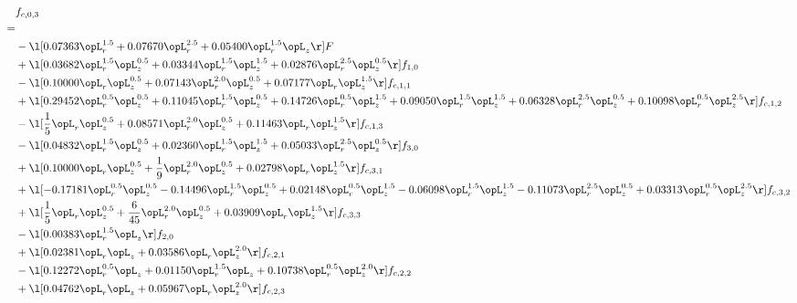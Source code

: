 \begin{alignat}{2} 
\label{eq:f_03_2} 
& f_{c,0,3} \nonumber \\ 
 = \\ 
& - \l[  0.07363 \opL_r^{1.5} +  0.07670 \opL_r^{2.5} +  0.05400 \opL_r^{1.5} \opL_z  \r] F \nonumber \\ 
& + \l[  0.03682 \opL_r^{1.5} \opL_z^{0.5} +  0.03344 \opL_r^{1.5} \opL_z^{1.5} +  0.02876 \opL_r^{2.5} \opL_z^{0.5}  \r] f_{1,0} \nonumber \\ 
& - \l[  0.10000 \opL_r \opL_z^{0.5} +  0.07143 \opL_r^{2.0} \opL_z^{0.5} +  0.07177 \opL_r \opL_z^{1.5}  \r] f_{c,1,1} \nonumber \\ 
& + \l[  0.29452 \opL_r^{0.5} \opL_z^{0.5} +  0.11045 \opL_r^{1.5} \opL_z^{0.5} +  0.14726 \opL_r^{0.5} \opL_z^{1.5} +  0.09050 \opL_r^{1.5} \opL_z^{1.5} +  0.06328 \opL_r^{2.5} \opL_z^{0.5} +  0.10098 \opL_r^{0.5} \opL_z^{2.5}  \r] f_{c,1,2} \nonumber \\ 
& - \l[ \frac{1}{5} \opL_r \opL_z^{0.5} +  0.08571 \opL_r^{2.0} \opL_z^{0.5} +  0.11463 \opL_r \opL_z^{1.5}  \r] f_{c,1,3} \nonumber \\ 
& - \l[  0.04832 \opL_r^{1.5} \opL_z^{0.5} +  0.02360 \opL_r^{1.5} \opL_z^{1.5} +  0.05033 \opL_r^{2.5} \opL_z^{0.5}  \r] f_{3,0} \nonumber \\ 
& + \l[  0.10000 \opL_r \opL_z^{0.5} + \frac{1}{9} \opL_r^{2.0} \opL_z^{0.5} +  0.02798 \opL_r \opL_z^{1.5}  \r] f_{c,3,1} \nonumber \\ 
& + \l[  -0.17181 \opL_r^{0.5} \opL_z^{0.5}   -0.14496 \opL_r^{1.5} \opL_z^{0.5} +  0.02148 \opL_r^{0.5} \opL_z^{1.5}   -0.06098 \opL_r^{1.5} \opL_z^{1.5}   -0.11073 \opL_r^{2.5} \opL_z^{0.5} +  0.03313 \opL_r^{0.5} \opL_z^{2.5}  \r] f_{c,3,2} \nonumber \\ 
& + \l[ \frac{1}{5} \opL_r \opL_z^{0.5} + \frac{6}{45} \opL_r^{2.0} \opL_z^{0.5} +  0.03909 \opL_r \opL_z^{1.5}  \r] f_{c,3,3} \nonumber \\ 
& - \l[  0.00383 \opL_r^{1.5} \opL_z  \r] f_{2,0} \nonumber \\ 
& + \l[  0.02381 \opL_r \opL_z +  0.03586 \opL_r \opL_z^{2.0}  \r] f_{c,2,1} \nonumber \\ 
& - \l[  0.12272 \opL_r^{0.5} \opL_z +  0.01150 \opL_r^{1.5} \opL_z +  0.10738 \opL_r^{0.5} \opL_z^{2.0}  \r] f_{c,2,2} \nonumber \\ 
& + \l[  0.04762 \opL_r \opL_z +  0.05967 \opL_r \opL_z^{2.0}  \r] f_{c,2,3} \nonumber \\ 
\end{alignat} 


